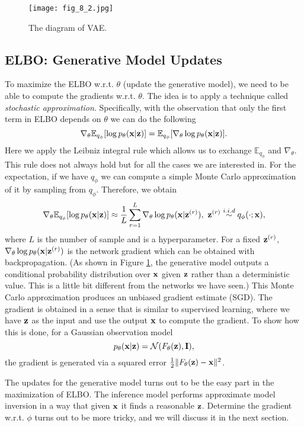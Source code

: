 \documentclass[../book-template.tex]{subfiles}
\begin{document}
\begin{figure}[h] 
	\centering 
	\texttt{[image: fig\_8\_2.jpg]} 
	\caption{The diagram of VAE.}\label{fig_8_2}
\end{figure}
\subsection{ELBO: Generative Model Updates}
To maximize the ELBO w.r.t. $\theta$ (update the generative model), we need to be able to compute the gradients w.r.t. $\theta$. The idea is to apply a technique called \emph{stochastic approximation}. Specifically, with the observation that only the first term in ELBO depends on $\theta$ we can do the following
\begin{equation*}
	\nabla_{\theta}\mathbb{E}_{q_{\phi}}[\log p_\theta({\bf x}|{\bf z})] = \mathbb{E}_{q_{\phi}}[\nabla_{\theta}\log p_\theta({\bf x}|{\bf z})].
\end{equation*}
Here we apply the Leibniz integral rule which allows us to exchange $\mathbb{E}_{q_\phi}$ and $\nabla_{\theta}$. This rule does not always hold but for all the cases we are interested in. For the expectation, if we have $q_\phi$ we can compute a simple Monte Carlo approximation of it by sampling from $q_\phi$. Therefore, we obtain
\begin{equation*}
	\nabla_{\theta}\mathbb{E}_{q_{\phi}}[\log p_\theta({\bf x}|{\bf z})] \approx \frac{1}{L}\sum_{r=1}^{L} \nabla_{\theta}\log p_\theta({\bf x}|{\bf z}^{(r)}),\ {\bf z}^{(r)}\overset{i.i.d}{\sim}q_\phi(\cdot;{\bf x}),
\end{equation*}
where $L$ is the number of sample and is a hyperparameter. For a fixed ${\bf z}^{(r)}$, $\nabla_{\theta}\log p_\theta({\bf x}|{\bf z}^{(r)})$ is the network gradient which can be obtained with backpropagation. (As shown in Figure \ref{fig_8_2}, the generative model outputs a conditional probability distribution over ${\bf x}$ given ${\bf z}$ rather than a deterministic value. This is a little bit different from the networks we have seen.) This Monte Carlo approximation produces an unbiased gradient estimate (SGD). The gradient is obtained in a sense that is similar to supervised learning, where we have ${\bf z}$ as the input and use the output ${\bf x}$ to compute the gradient. To show how this is done, for a Gaussian observation model
\begin{equation}\label{eq_8_gau_obs}
	p_\theta({\bf x}|{\bf z})=\mathcal{N}(F_\theta({\bf z}), {\bf I}),
\end{equation}
the gradient is generated via a squared error $\frac{1}{2}\|F_\theta({\bf z})-{\bf x}\|^2$.
\par The updates for the generative model turns out to be the easy part in the maximization of ELBO. The inference model performs approximate model inversion in a way that given ${\bf x}$ it finds a reasonable ${\bf z}$. Determine the gradient w.r.t. $\phi$ turns out to be more tricky, and we will discuss it in the next section.
\end{document}
